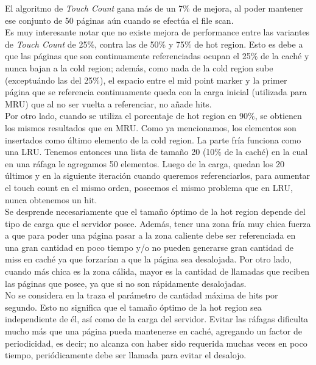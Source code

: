 \documentclass[11pt, a4paper, spanish]{article}
\begin{document}
El algoritmo de \textit{Touch Count} gana m\'as de un 7\% de mejora, al poder mantener ese conjunto de 50 p\'aginas a\'un cuando se efect\'ua 
el file scan.\\

Es muy interesante notar que no existe mejora de performance entre las variantes de \textit{Touch Count} de 25\%, contra las de  50\% y 75\% de
hot region. Esto es debe a que las p\'aginas que son continuamente referenciadas ocupan el 25\% de la cach\'e y nunca bajan a la cold region; 
adem\'as, como nada de la cold region sube (exceptu\'ando las del 25\%), el espacio entre el mid point marker y 
la primer p\'agina que se referencia continuamente queda con la carga inicial (utilizada para MRU) que al no ser vuelta a referenciar,
 no a\~{n}ade hits.\\

Por otro lado, cuando se utiliza el porcentaje de hot region en 90\%, se obtienen los mismos resultados que en MRU. Como ya mencionamos, 
los elementos son insertados como \'ultimo elemento de la cold region. La parte fr\'ia funciona como una LRU. 
Tenemos entonces una lista de tama\~{n}o 20 (10\% de la cach\'e) en la cual en una r\'afaga le agregamos 50 elementos. 
Luego de la carga, quedan los 20 \'ultimos y en la siguiente iteraci\'on cuando queremos referenciarlos, para aumentar el
 touch count en el mismo orden, poseemos el mismo problema que en LRU, nunca obtenemos un hit.\\

Se desprende necesariamente que el tama\~{n}o \'optimo de la hot region depende del tipo de carga que el servidor posee.
 Adem\'as, tener una zona fr\'ia muy chica fuerza a que para poder una p\'agina pasar a la zona caliente debe ser referenciada 
en una gran cantidad en poco tiempo y/o no pueden generarse gran cantidad de miss en cach\'e ya que forzar\'ian a que la
 p\'agina sea desalojada. Por otro lado, cuando m\'as chica es la zona c\'alida, mayor es la cantidad de llamadas 
que reciben las p\'aginas que posee, ya que si no son r\'apidamente desalojadas.\\

No se considera en la traza el par\'ametro de cantidad m\'axima de hits por segundo. 
Esto no significa que el tama\~{n}o \'optimo de la hot region sea independiente de \'el, as\'i como de la carga del servidor.
Evitar las r\'afagas dificulta mucho m\'as que una p\'agina pueda mantenerse en cach\'e, agregando un factor de periodicidad,
 es decir; no alcanza con haber sido requerida muchas veces en poco tiempo, peri\'odicamente debe ser llamada para evitar el desalojo.\\
\end{document}
